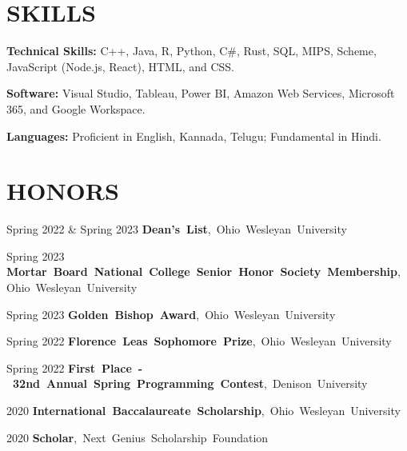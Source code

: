 \documentclass[10pt, letterpaper]{article}
\begin{document}
\section{SKILLS}

\begin{onecolentry}
    \textbf{Technical Skills:} C++, Java, R, Python, C\#, Rust, SQL, MIPS, Scheme, JavaScript (Node.js, React), HTML, and CSS.
\end{onecolentry}
\vspace{\highlightSpacing}
\begin{onecolentry}
    \textbf{Software:} Visual Studio, Tableau, Power BI, Amazon Web Services, Microsoft 365, and Google Workspace.
\end{onecolentry}
\vspace{\highlightSpacing}
\begin{onecolentry}
    \textbf{Languages:} Proficient in English, Kannada, Telugu; Fundamental in Hindi.
\end{onecolentry}

\section{HONORS}

\begin{honorstwocolentry}{Spring 2022 \& Spring 2023}
    \mbox{\textbf{Dean's List}, Ohio Wesleyan University}
\end{honorstwocolentry}
\vspace{\highlightSpacing}
\begin{honorstwocolentry}{Spring 2023}
    \mbox{\textbf{Mortar Board National College Senior Honor Society Membership}, Ohio Wesleyan University}
\end{honorstwocolentry}
\vspace{\highlightSpacing}
\begin{honorstwocolentry}{Spring 2023}
    \mbox{\textbf{Golden Bishop Award}, Ohio Wesleyan University}
\end{honorstwocolentry}
\vspace{\highlightSpacing}
\begin{honorstwocolentry}{Spring 2022}
    \mbox{\textbf{Florence Leas Sophomore Prize}, Ohio Wesleyan University}
\end{honorstwocolentry}
\vspace{\highlightSpacing}
\begin{honorstwocolentry}{Spring 2022}
    \mbox{\textbf{First Place - 32nd Annual Spring Programming Contest}, Denison University}
\end{honorstwocolentry}
\vspace{\highlightSpacing}
\begin{honorstwocolentry}{2020}
    \mbox{\textbf{International Baccalaureate Scholarship}, Ohio Wesleyan University}
\end{honorstwocolentry}
\vspace{\highlightSpacing}
\begin{honorstwocolentry}{2020}
    \mbox{\textbf{Scholar}, Next Genius Scholarship Foundation}
\end{honorstwocolentry}
\vspace{\highlightSpacing}
\end{document}
